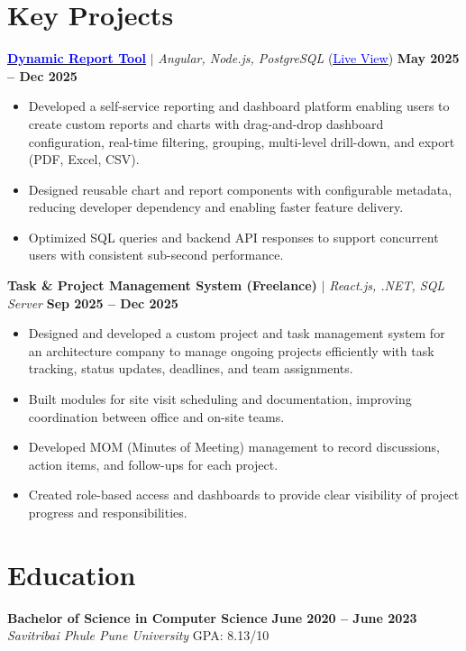 \documentclass[11pt,letterpaper]{article}
\begin{document}
\section{Key Projects}

\textbf{\href{https://report-tool-swart.vercel.app}{\underline{\textcolor{blue}{Dynamic Report Tool}}}} $|$ 
\textit{Angular, Node.js, PostgreSQL}
(\href{https://report-tool-swart.vercel.app}{\underline{\textcolor{blue}{Live View}}})
\hfill \textbf{May 2025 – Dec 2025}
\vspace{-6pt}
\begin{itemize}[label=\textbullet, leftmargin=16pt, labelsep=6pt, itemsep=1.5pt]
    \item Developed a self-service reporting and dashboard platform enabling users to create custom reports and charts with drag-and-drop dashboard configuration, real-time filtering, grouping, multi-level drill-down, and export (PDF, Excel, CSV).
    \item Designed reusable chart and report components with configurable metadata, reducing developer dependency and enabling faster feature delivery.
    \item Optimized SQL queries and backend API responses to support concurrent users with consistent sub-second performance.
\end{itemize}

\vspace{3pt}

\textbf{Task \& Project Management System (Freelance)} $|$ 
\textit{React.js, .NET, SQL Server}
\hfill \textbf{Sep 2025 – Dec 2025}
\vspace{-6pt}
\begin{itemize}[label=\textbullet, leftmargin=16pt, labelsep=6pt, itemsep=1.5pt]
    \item Designed and developed a custom project and task management system for an architecture company to manage ongoing projects efficiently with task tracking, status updates, deadlines, and team assignments.
    \item Built modules for site visit scheduling and documentation, improving coordination between office and on-site teams.
    \item Developed MOM (Minutes of Meeting) management to record discussions, action items, and follow-ups for each project.
    \item Created role-based access and dashboards to provide clear visibility of project progress and responsibilities.
\end{itemize}

\section{Education}

\textbf{Bachelor of Science in Computer Science} \hfill \textbf{June 2020 – June 2023} \\
\textit{Savitribai Phule Pune University} \hfill GPA: 8.13/10
\end{document}
